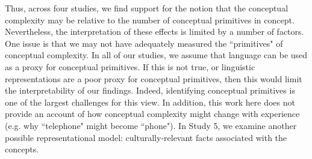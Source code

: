 Thus, across four studies, we find support for the notion that the conceptual complexity may be relative to the number of conceptual primitives in concept.   Nevertheless, the interpretation of these effects is limited by a number of factors. One issue is  that we  may not have  adequately measured the ``primitives" of conceptual complexity. In all of our studies, we assume that language can be used as a proxy for conceptual primitives. If this is not true, or linguistic representations are a poor proxy for conceptual primitives, then this would limit the interpretability of our findings. Indeed, identifying  conceptual primitives is one of the largest challenges for this view. In addition, this work here does not provide an account of how conceptual complexity might change with experience (e.g. why ``telephone" might become ``phone").  In Study 5, we examine another possible representational model: culturally-relevant facts associated with the concepts. 


